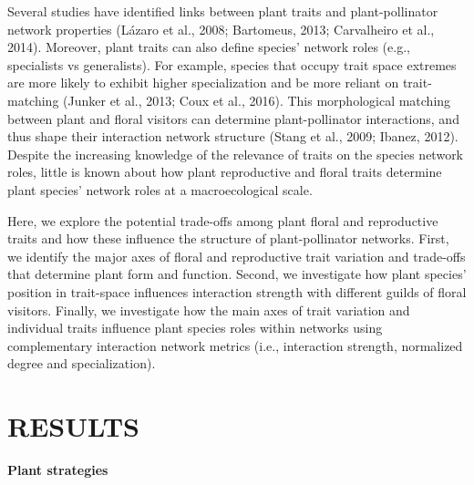 \documentclass[12pt,a4paper,]{article}
\begin{document}
Several studies have identified links between plant traits and
plant-pollinator network properties (Lázaro et al., 2008; Bartomeus,
2013; Carvalheiro et al., 2014). Moreover, plant traits can also define
species' network roles (e.g., specialists vs generalists). For example,
species that occupy trait space extremes are more likely to exhibit
higher specialization and be more reliant on trait-matching (Junker et
al., 2013; Coux et al., 2016). This morphological matching between plant
and floral visitors can determine plant-pollinator interactions, and
thus shape their interaction network structure (Stang et al., 2009;
Ibanez, 2012). Despite the increasing knowledge of the relevance of
traits on the species network roles, little is known about how plant
reproductive and floral traits determine plant species' network roles at
a macroecological scale.

Here, we explore the potential trade-offs among plant floral and
reproductive traits and how these influence the structure of
plant-pollinator networks. First, we identify the major axes of floral
and reproductive trait variation and trade-offs that determine plant
form and function. Second, we investigate how plant species' position in
trait-space influences interaction strength with different guilds of
floral visitors. Finally, we investigate how the main axes of trait
variation and individual traits influence plant species roles within
networks using complementary interaction network metrics (i.e.,
interaction strength, normalized degree and specialization).

\section{RESULTS}\label{results}

\textbf{Plant strategies}
\end{document}
